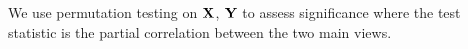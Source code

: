 \documentclass{llncs}
\newcommand{\X}{{\bf X}}
\newcommand{\x}{{\bf x}}
\newcommand{\Y}{{\bf Y}}
\newcommand{\y}{{\bf y}}
\newcommand{\Z}{{\bf Z}}
\begin{document}
\vspace{-0.1in}
We use permutation testing on $\X$, $\Y$ to assess significance where
the test statistic is the partial correlation between the two main views.

 

\end{document}
